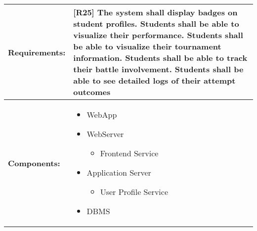 \begin{table}[!ht]
    \centering
    {\renewcommand{\arraystretch}{2} %
    \setlength{\tabcolsep}{0.5em} %
    \begin{tabularx}{\textwidth}{|l|X|}
    \hline
       \textbf{Requirements:} & [R25] The system shall display badges on student profiles. \newline
        [R28] Students shall be able to visualize their performance. \newline
        [R29] Students shall be able to visualize their tournament information. \newline
        [R30] Students shall be able to track their battle involvement. \newline
        [R31] Students shall be able to see detailed logs of their attempt outcomes
       \\ \hline
        \textbf{Components:} & 
        \begin{minipage} [t] {0.4\textwidth} 
      \begin{itemize}
      \item WebApp
      \item WebServer
        \begin{itemize}
            \item Frontend Service
        \end{itemize}
      \item Application Server
        \begin{itemize}
            \item User Profile Service
        \end{itemize}
      \item DBMS
     \end{itemize} 
    \end{minipage} \\ [2pt]  \hline
    \end{tabularx}} \quad
\end{table}

